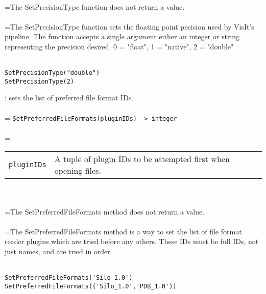 \documentclass[10pt,a4paper]{report}
\begin{document}
 \\ 
\hangindent=\parindent The SetPrecisionType function does not return a value. \\[-3mm] 

 \\ 
\hangindent=\parindent The SetPrecisionType function sets the floating point pecision used by VisIt's pipeline.  The function accepts a single argument either an integer or string representing the precision desired. 0 = "float", 1 = "native", 2 = "double" \\[-3mm] 

\\[-6mm]
\begin{verbatim}SetPrecisionType("double")
SetPrecisionType(2)
\end{verbatim}
\newpage


{}
: sets the list of preferred file format IDs.\\[-3mm]

 \\ 
\hangindent=\parindent 
\verb!SetPreferredFileFormats(pluginIDs) -> integer!\\ [-3mm]

 \\ 
\hangindent=\parindent 
\begin{tabular}{lp{9cm}}
\verb!pluginIDs! & A tuple of plugin IDs to be attempted first when opening files. \\
\end{tabular} \\[-2mm]


 \\ 
\hangindent=\parindent The SetPreferredFileFormats method does not return a value. \\[-3mm] 

 \\ 
\hangindent=\parindent The SetPreferredFileFormats method is a way to set the list of file format reader plugins which are tried before any others. These IDs must be full IDs, not just names, and are tried in order. \\[-3mm] 

\\[-6mm]
\begin{verbatim}SetPreferredFileFormats('Silo_1.0')
SetPreferredFileFormats(('Silo_1.0','PDB_1.0'))
\end{verbatim}
\newpage
\end{document}
